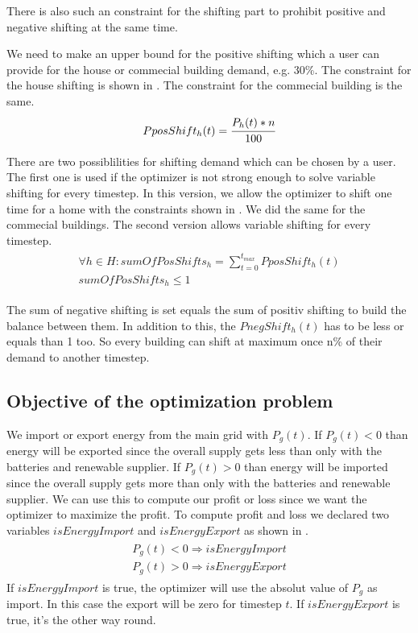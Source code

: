 There is also such an constraint for the shifting part to prohibit positive and negative shifting at the same time.

We need to make an upper bound for the positive shifting which a user can provide for the house or commecial building demand, e.g. 30\%.
The constraint for the house shifting is shown in .
The constraint for the commecial building is the same.
\begin{align} \label{eq:shiftingUpperBound}
\begin{split}
PposShift_h(t) = \cfrac{P_{h}(t) * n}{100}
\end{split}
\end{align}

There are two possiblilities for shifting demand which can be chosen by a user.
The first one is used if the optimizer is not strong enough to solve variable shifting for every timestep.
In this version, we allow the optimizer to shift one time for a home with the constraints shown in .
We did the same for the commecial buildings.
The second version allows variable shifting for every timestep.
\begin{align} \label{eq:numberOfShifts}
\begin{split}
\forall h \in H: sumOfPosShifts_{h} = \sum\limits_{t = 0}^{t_{max}} PposShift_h(t)\\
sumOfPosShifts_{h} \leq 1
\end{split}
\end{align}

The sum of negative shifting is set equals the sum of positiv shifting to build the balance between them.
In addition to this, the $PnegShift_h(t)$ has to be less or equals than 1 too.
So every building can shift at maximum once  n\% of their demand to another timestep.

\subsection{Objective of the optimization problem}
We import or export energy from the main grid with $P_{g}(t)$.
If $P_{g}(t) < 0$ than energy will be exported since the overall supply gets less than only with the batteries and renewable supplier.
If $P_{g}(t) > 0$ than energy will be imported since the overall supply gets more than only with the batteries and renewable supplier.
We can use this to compute our profit or loss since we want the optimizer to maximize the profit.
To compute profit and loss we declared two variables $isEnergyImport$ and $isEnergyExport$ as shown in .
\begin{align} \label{eq:importexport}
\begin{split}
P_{g}(t) < 0 \Rightarrow isEnergyImport\\
P_{g}(t) > 0 \Rightarrow isEnergyExport
\end{split}
\end{align}
If $isEnergyImport$ is true, the optimizer will use the absolut value of $P_{g}$ as import.
In this case the export will be zero for timestep $t$.
If $isEnergyExport$ is true, it's the other way round.


